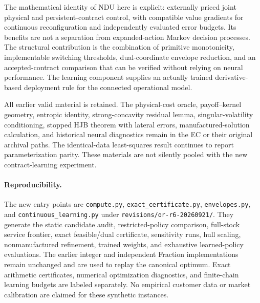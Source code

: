 The mathematical identity of NDU here is explicit: externally priced joint physical and persistent-contract control, with compatible value gradients for continuous reconfiguration and independently evaluated error budgets. Its benefits are not a separation from expanded-action Markov decision processes. The structural contribution is the combination of primitive monotonicity, implementable switching thresholds, dual-coordinate envelope reduction, and an accepted-contract comparison that can be verified without relying on neural performance. The learning component supplies an actually trained derivative-based deployment rule for the connected operational model.

All earlier valid material is retained. The physical-cost oracle, payoff--kernel geometry, entropic identity, strong-concavity residual lemma, singular-volatility conditioning, stopped HJB theorem with lateral errors, manufactured-solution calculation, and historical neural diagnostics remain in the EC or their original archival paths. The identical-data least-squares result continues to report parameterization parity. These materials are not silently pooled with the new contract-learning experiment.

\paragraph{Reproducibility.}
The new entry points are \texttt{compute.py}, \texttt{exact\_certificate.py}, \texttt{envelopes.py}, and \texttt{continuous\_learning.py} under \texttt{revisions/or-r6-20260921/}. They generate the static candidate audit, restricted-policy comparison, full-stock service frontier, exact feasible/dual certificate, sensitivity runs, hull scaling, nonmanufactured refinement, trained weights, and exhaustive learned-policy evaluations. The earlier integer and independent Fraction implementations remain unchanged and are used to replay the canonical optimum. Exact arithmetic certificates, numerical optimization diagnostics, and finite-chain learning budgets are labeled separately. No empirical customer data or market calibration are claimed for these synthetic instances.
